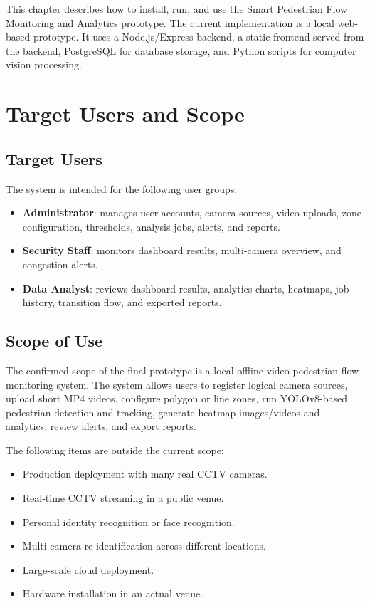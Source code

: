 \documentclass[12pt,a4paper]{report}
\begin{document}
This chapter describes how to install, run, and use the Smart Pedestrian Flow Monitoring and Analytics prototype. The current implementation is a local web-based prototype. It uses a Node.js/Express backend, a static frontend served from the backend, PostgreSQL for database storage, and Python scripts for computer vision processing.

\section{Target Users and Scope}

\subsection{Target Users}

The system is intended for the following user groups:

\begin{itemize}
    \item \textbf{Administrator}: manages user accounts, camera sources, video uploads, zone configuration, thresholds, analysis jobs, alerts, and reports.
    \item \textbf{Security Staff}: monitors dashboard results, multi-camera overview, and congestion alerts.
    \item \textbf{Data Analyst}: reviews dashboard results, analytics charts, heatmaps, job history, transition flow, and exported reports.
\end{itemize}

\subsection{Scope of Use}

The confirmed scope of the final prototype is a local offline-video pedestrian flow monitoring system. The system allows users to register logical camera sources, upload short MP4 videos, configure polygon or line zones, run YOLOv8-based pedestrian detection and tracking, generate heatmap images/videos and analytics, review alerts, and export reports.

The following items are outside the current scope:

\begin{itemize}
    \item Production deployment with many real CCTV cameras.
    \item Real-time CCTV streaming in a public venue.
    \item Personal identity recognition or face recognition.
    \item Multi-camera re-identification across different locations.
    \item Large-scale cloud deployment.
    \item Hardware installation in an actual venue.
\end{itemize}
\end{document}
